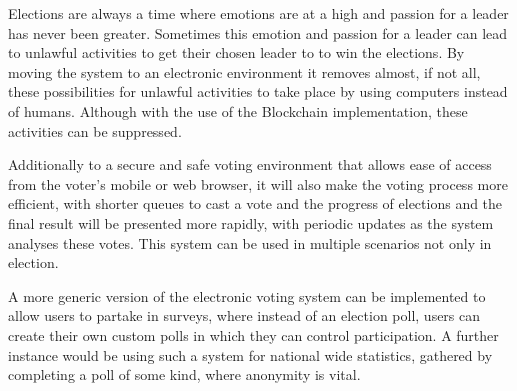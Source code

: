 Elections are always a time where emotions are at a high and passion for a leader has never been greater. Sometimes this emotion and passion for a leader can lead to unlawful activities to get their chosen leader to to win the elections. By moving the system to an electronic environment it removes almost, if not all, these possibilities for unlawful activities to take place by using computers instead of humans. Although with the use of the Blockchain implementation, these activities can be suppressed.
	
Additionally to a secure and safe voting environment that allows ease of access from the voter's mobile or web browser, it will also make the voting process more efficient, with shorter queues to cast a vote and the progress of elections and the final result will be presented more rapidly, with periodic updates as the system analyses these votes. This system can be used in multiple scenarios not only in election. 

A more generic version of the electronic voting system can be implemented to allow users to partake in surveys, where instead of an election poll, users can create their own custom polls in which they can control participation. A further instance would be using such a system for national wide statistics, gathered by completing a poll of some kind, where anonymity is vital.